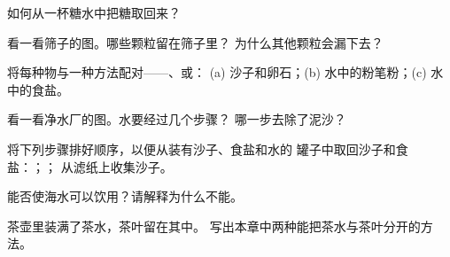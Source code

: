 \begin{exercise}[$\star$]\label{exo:g3:separating-mixtures:5}
如何从一杯糖水中把糖取回来？
\end{exercise}

\begin{exercise}[$\star$]\label{exo:g3:separating-mixtures:6}
看一看筛子的图。哪些颗粒留在筛子里？
为什么其他颗粒会漏下去？
\end{exercise}

\begin{exercise}[$\star$]\label{exo:g3:separating-mixtures:7}
将每种物与一种方法配对——、或：
(a) 沙子和卵石；(b) 水中的粉笔粉；(c) 水中的食盐。
\end{exercise}

\begin{exercise}[$\star$]\label{exo:g3:separating-mixtures:8}
看一看净水厂的图。水要经过几个步骤？
哪一步去除了泥沙？
\end{exercise}

\begin{exercise}[$\star$]\label{exo:g3:separating-mixtures:9}
将下列步骤排好顺序，以便从装有沙子、食盐和水的
罐子中取回沙子和食盐：；；
从滤纸上收集沙子。
\end{exercise}

\begin{exercise}[$\star\star$]\label{exo:g3:separating-mixtures:10}
能否使海水可以饮用？请解释为什么不能。
\end{exercise}

\begin{exercise}[$\star\star$]\label{exo:g3:separating-mixtures:11}
茶壶里装满了茶水，茶叶留在其中。
写出本章中两种能把茶水与茶叶分开的方法。
\end{exercise}
